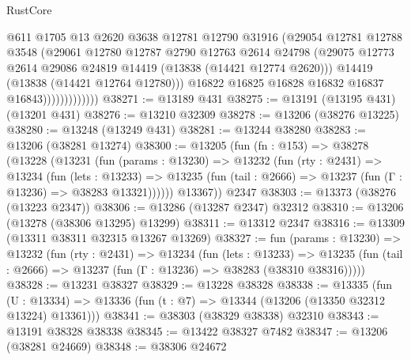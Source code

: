 \begin{lexlean}{RustCore}
\begin{coremodule}
                            @611
                            @1705
                            @13
                            @2620
                            @3638
                            @12781
                            @12790
                            @31916
                            (@29054
                              @12781
                              @12788
                              @3548
                              (@29061
                                @12780
                                @12787
                                @2790
                                @12763
                                @2614
                                @24798
                                (@29075
                                  @12773
                                  @2614
                                  @29086
                                  @24819
                                  @14419
                                  (@13838 (@14421 @12774 @2620)))
                                @14419
                                (@13838 (@14421 @12764 @12780)))
                              @16822
                              @16825
                              @16828
                              @16832
                              @16837
                              @16843)))))))))))))
@38271 := @13189 @431
@38275 := @13191 (@13195 @431) (@13201 @431)
@38276 := @13210 @32309
@38278 := @13206 (@38276 @13225)
@38280 := @13248 (@13249 @431)
@38281 := @13244 @38280
@38283 := @13206 (@38281 @13274)
@38300 := @13205
    (fun (fn : @153) =>
    @38278
      (@13228
        (@13231
          (fun (params : @13230) =>
          @13232
            (fun (rty : @2431) =>
            @13234
              (fun (lets : @13233) =>
              @13235 (fun (tail : @2666) => @13237 (fun (Γ : @13236) => @38283 @13321))))))
        @13367))
    @2347
@38303 := @13373 (@38276 (@13223 @2347))
@38306 := @13286 (@13287 @2347) @32312
@38310 := @13206 (@13278 (@38306 @13295) @13299)
@38311 := @13312 @2347
@38316 := @13309 (@13311 @38311 @32315 @13267 @13269)
@38327 := fun (params : @13230) =>
  @13232
    (fun (rty : @2431) =>
    @13234
      (fun (lets : @13233) =>
      @13235 (fun (tail : @2666) => @13237 (fun (Γ : @13236) => @38283 (@38310 @38316)))))
@38328 := @13231 @38327
@38329 := @13228 @38328
@38338 := @13335
    (fun (U : @13334) => @13336 (fun (t : @7) => @13344 (@13206 (@13350 @32312 @13224) @13361)))
@38341 := @38303 (@38329 @38338) @32310
@38343 := @13191 @38328 @38338
@38345 := @13422 @38327 @7482
@38347 := @13206 (@38281 @24669)
@38348 := @38306 @24672

\end{coremodule}
\end{lexlean}
